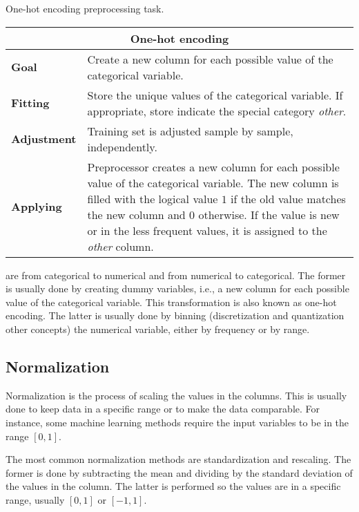 \begin{tablebox}[label=tab:one-hot]{One-hot encoding preprocessing task.}
  \centering
  \begin{tabular}{lp{6cm}}
    \toprule
    \multicolumn{2}{c}{\textbf{One-hot encoding}} \\
    \midrule
    \textbf{Goal} &
      Create a new column for each possible value of the categorical variable. \\
    \textbf{Fitting} &
      Store the unique values of the categorical variable.  If appropriate, store indicate
      the special category \emph{other}.  \\
    \textbf{Adjustment} &
      Training set is adjusted sample by sample, independently. \\
    \textbf{Applying} &
      Preprocessor creates a new column for each possible value of the categorical
      variable.  The new column is filled with the logical value $1$ if the old value
      matches the new column and $0$ otherwise.  If the value is new or in the less
      frequent values, it is assigned to the \emph{other} column.  \\
    \bottomrule
  \end{tabular}
\end{tablebox}

are from categorical to numerical and from numerical to
categorical.  The former is usually done by creating dummy variables, i.e., a new column
for each possible value of the categorical variable.  This transformation is also known as
one-hot encoding.  The latter is usually done by binning (discretization and quantization
other concepts) the numerical variable, either by
frequency or by range.


\subsection{Normalization}

Normalization is the process of scaling the values in the columns.  This is usually done to
keep data in a specific range or to make the data comparable.  For instance, some machine
learning methods require the input variables to be in the range $[0, 1]$.

The most common normalization methods are standardization and rescaling.  The former is done
by subtracting the mean and dividing by the standard deviation of the values in the column.
The latter is performed so the values are in a specific range, usually $[0, 1]$ or $[-1, 1]$.

